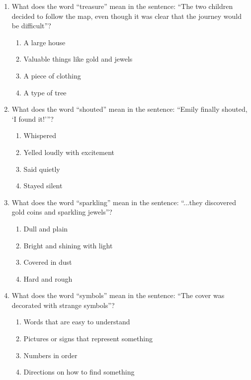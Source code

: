 \documentclass[12pt]{article}
\begin{document}
\begin{enumerate}
    \item What does the word “treasure” mean in the sentence: “The two children decided to follow the map, even though it was clear that the journey would be difficult”?
    \begin{enumerate}[label=\Alph*.]
        \item A large house
        \item Valuable things like gold and jewels
        \item A piece of clothing
        \item A type of tree
    \end{enumerate}
    \vspace{0.5cm}

    \item What does the word “shouted” mean in the sentence: “Emily finally shouted, ‘I found it!’”?
    \begin{enumerate}[label=\Alph*.]
        \item Whispered
        \item Yelled loudly with excitement
        \item Said quietly
        \item Stayed silent
    \end{enumerate}
    \vspace{0.5cm}


\vspace{3cm}
    \item What does the word “sparkling” mean in the sentence: “...they discovered gold coins and sparkling jewels”?
    \begin{enumerate}[label=\Alph*.]
        \item Dull and plain
        \item Bright and shining with light
        \item Covered in dust
        \item Hard and rough
    \end{enumerate}
    \vspace{0.5cm}

    \item What does the word “symbols” mean in the sentence: “The cover was decorated with strange symbols”?
    \begin{enumerate}[label=\Alph*.]
        \item Words that are easy to understand
        \item Pictures or signs that represent something
        \item Numbers in order
        \item Directions on how to find something
    \end{enumerate}
    \vspace{0.5cm}


\end{enumerate}
\end{document}
